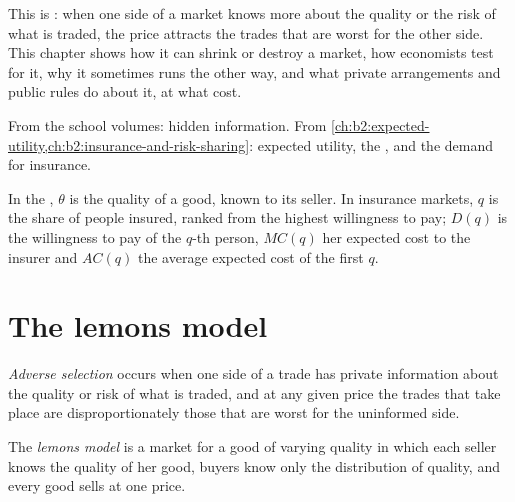 This is : when one side of a market knows more about the quality or the risk of what is traded,
the price attracts the trades that are worst for the other side. This chapter shows how it can shrink or destroy a
market, how economists test for it, why it sometimes runs the other way, and what private arrangements and public
rules do about it, at what cost.

\begin{recall}
From the school volumes: hidden information. From \cref{ch:b2:expected-utility,ch:b2:insurance-and-risk-sharing}:
expected utility, the , and the demand for insurance.
\end{recall}

\begin{notation}\label{not:b2:adverse-selection:symbols}
In the , $\theta$ is the quality of a good, known to its seller. In insurance markets, $q$ is the share of people
insured, ranked from the highest willingness to pay; $D(q)$ is the willingness to pay of the $q$-th person, $\mathit{MC}(q)$ her
expected cost to the insurer and $\mathit{AC}(q)$ the average expected cost of the first $q$.
\end{notation}

\section{The lemons model}\label{sec:b2:adverse-selection:lemons}

\begin{definition}\label{def:b2:adverse-selection:adverse-selection}
\emph{Adverse selection} occurs when one side of a trade has private information about the
quality or risk of what is traded, and at any given price the trades that take place are disproportionately those
that are worst for the uninformed side.
\end{definition}

\begin{definition}\label{def:b2:adverse-selection:lemons}
The \emph{lemons model} is a market for a good of varying quality in which each seller knows the
quality of her good, buyers know only the distribution of quality, and every good sells at one price.
\end{definition}

